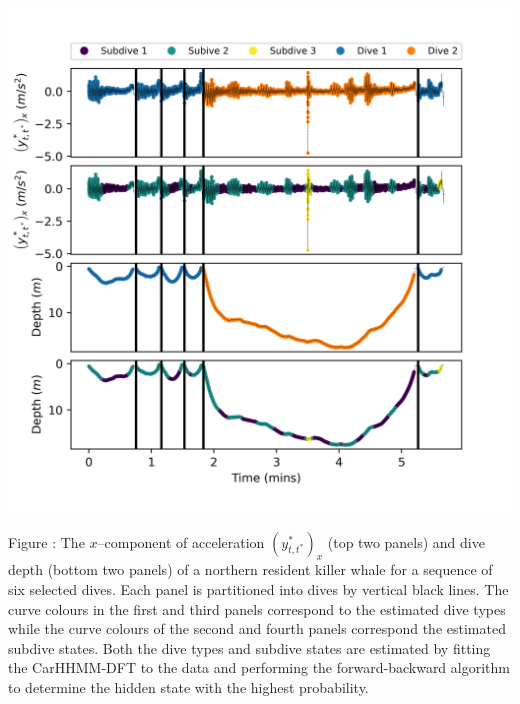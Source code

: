 \documentclass{article}
\begin{document}
        \begin{center}
        \includegraphics[width=6in]{../Plots/2019/20190902-182840-CATs_OB_1_0_267_CarHHMM2_decoded_dives.png}
        \end{center}
        
        \noindent Figure : The $x$--component of acceleration $\left(y^*_{t,t^*}\right)_x$ (top two panels) and dive depth (bottom two panels) of a northern resident killer whale for a sequence of six selected dives. Each panel is partitioned into dives by vertical black lines. The curve colours in the first and third panels correspond to the estimated dive types while the curve colours of the second and fourth panels correspond the estimated subdive states. Both the dive types and subdive states are estimated by fitting the CarHHMM-DFT to the data and performing the forward-backward algorithm to determine the hidden state with the highest probability.
        \addtocounter{fignum}{1}
        
\end{document}
